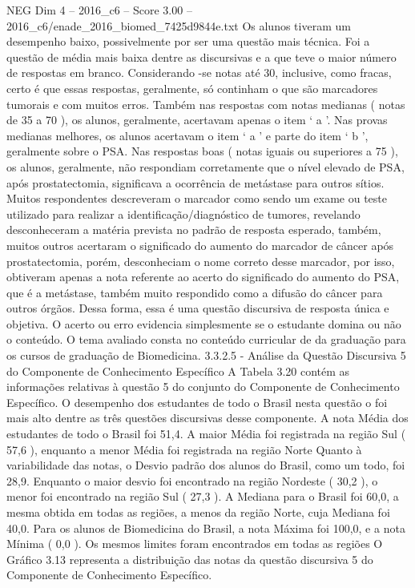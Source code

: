 \begin{textsample}{NEG Dim 4 – 2016\_c6 – Score 3.00 – 2016\_c6/enade\_2016\_biomed\_7425d9844e.txt}
Os alunos tiveram um desempenho baixo, possivelmente por ser uma questão mais técnica.
Foi a questão de média mais baixa dentre as discursivas e a que teve o maior número de respostas em branco.
Considerando -se notas até 30, inclusive, como fracas, certo é que essas respostas, geralmente, só continham o que são marcadores tumorais e com muitos erros.
Também nas respostas com notas medianas ( notas de 35 a 70 ), os alunos, geralmente, acertavam apenas o item ‘ a ’.
Nas provas medianas melhores, os alunos acertavam o item ‘ a ’ e parte do item ‘ b ’, geralmente sobre o PSA.
Nas respostas boas ( notas iguais ou superiores a 75 ), os alunos, geralmente, não respondiam corretamente que o nível elevado de PSA, após prostatectomia, significava a ocorrência de metástase para outros sítios.
Muitos respondentes descreveram o marcador como sendo um exame ou teste utilizado para realizar a identificação/diagnóstico de tumores, revelando desconheceram a matéria prevista no padrão de resposta esperado, também, muitos outros acertaram o significado do aumento do marcador de câncer após prostatectomia, porém, desconheciam o nome correto desse marcador, por isso, obtiveram apenas a nota referente ao acerto do significado do aumento do PSA, que é a metástase, também muito respondido como a difusão do câncer para outros órgãos.
Dessa forma, essa é uma questão discursiva de resposta única e objetiva.
O acerto ou erro evidencia simplesmente se o estudante domina ou não o conteúdo.
O tema avaliado consta no conteúdo curricular de da graduação para os cursos de graduação de Biomedicina. 3.3.2.5 - Análise da Questão Discursiva 5 do Componente de Conhecimento Específico A Tabela 3.20 contém as informações relativas à questão 5 do conjunto do Componente de Conhecimento Específico.
O desempenho dos estudantes de todo o Brasil nesta questão o foi mais alto dentre as três questões discursivas desse componente.
A nota Média dos estudantes de todo o Brasil foi 51,4.
A maior Média foi registrada na região Sul ( 57,6 ), enquanto a menor Média foi registrada na região Norte Quanto à variabilidade das notas, o Desvio padrão dos alunos do Brasil, como um todo, foi 28,9.
Enquanto o maior desvio foi encontrado na região Nordeste ( 30,2 ), o menor foi encontrado na região Sul ( 27,3 ).
A Mediana para o Brasil foi 60,0, a mesma obtida em todas as regiões, a menos da região Norte, cuja Mediana foi 40,0.
Para os alunos de Biomedicina do Brasil, a nota Máxima foi 100,0, e a nota Mínima ( 0,0 ).
Os mesmos limites foram encontrados em todas as regiões O Gráfico 3.13 representa a distribuição das notas da questão discursiva 5 do Componente de Conhecimento Específico.

\end{textsample}
